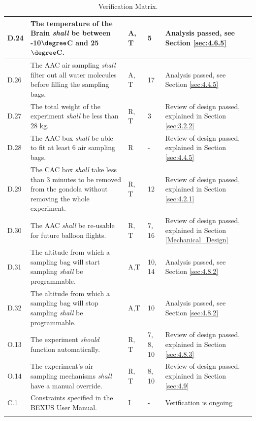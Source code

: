 \documentclass[a4paper,12pt,twoside]{article}
\begin{document}
\begin{longtable}[]{|m{}| m{} |m{} |m{}|m{}|}
D.24 & The temperature of the Brain \textit{shall} be between -10$\degree$C and 25$\degree$C.                                                                                                 &       A, T       & 5           & Analysis passed, see Section \ref{sec:4.6.5}       \\    \hline
D.26 & The AAC air sampling \textit{shall} filter out all water molecules before filling the sampling bags.                                                                             &        A, T      & 17            &  Analysis passed, see Section \ref{sec:4.4.5}        \\
\hline
D.27 & The total weight of the experiment \textit{shall} be less than 28 kg.
 & R, T & 3 & Review of design passed, explained in Section \ref{sec:3.2.2} \\\hline
 D.28 & The AAC box \textit{shall} be able to ﬁt at least 6 air sampling bags. & R & - & Review of design passed, explained in Section \ref{sec:4.4.5}\\\hline
D.29 &  The CAC box \textit{shall} take less than 3 minutes to be removed from the gondola without removing the whole experiment.
 & R, T & 12 & Review of design passed, explained in Section \ref{sec:4.2.1}\\\hline
 D.30 & The AAC \textit{shall} be re-usable for future balloon flights.                                                                           &        R, T      & 7, 16            & Review of design passed, explained in Section \ref{Mechanical_Design}      \\
\hline
D.31  & The altitude from which a sampling bag will start sampling \textit{shall} be programmable. & A,T&  10, 14  & Analysis passed, see Section \ref{sec:4.8.2}\\ \hline
D.32  & The altitude from which a sampling bag will stop sampling \textit{shall} be programmable.& A,T & 10  & Analysis passed, see Section \ref{sec:4.8.2}\\ \hline

O.13 & The experiment \textit{should} function automatically.                                                           &      R, T        & 7, 8, 10            &    Review of design passed, explained in Section \ref{sec:4.8.3}    \\ \hline
O.14 & The experiment's air sampling mechanisms \textit{shall} have a manual override.                                                           &      R, T        & 8, 10            &    Review of design passed, explained in Section \ref{sec:4.9}    \\ \hline
C.1  & Constraints specified in the BEXUS User Manual.                                                                                                                          &       I       & -            & Verification is ongoing     \\ \hline

\caption{Verification Matrix.}
\label{tab:var-mat}
\end{longtable}
\raggedbottom
\pagebreak
\end{document}
